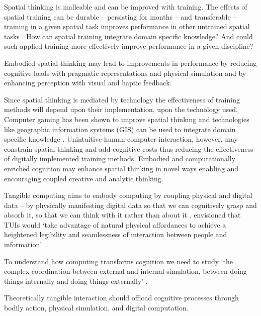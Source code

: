 Spatial thinking is malleable and can be improved with training. 
The effects of spatial training can be durable -- persisting for months -- and transferable -- training in a given spatial task improves performance in other untrained spatial tasks \cite{Uttal2013}. 
How can spatial training integrate domain specific knowledge? And could such applied training more effectively improve performance in a given discipline? \cite{Uttal2013} 

Embodied spatial thinking may lead to improvements in performance by reducing cognitive loads with pragmatic representations and physical simulation and by enhancing perception with visual and haptic feedback. 

Since spatial thinking is mediated by technology the effectiveness of training methods will depend upon their implementation, upon the technology used. 
Computer gaming has been shown to improve spatial thinking and technologies like geographic information systems (GIS) can be used to integrate domain specific knowledge \cite{Uttal2013}.
Unintuitive human-computer interaction, however, may constrain spatial thinking and add cognitive costs thus reducing the effectiveness of digitally implemented training methods. 
Embodied and computationally enriched cognition may enhance spatial thinking in novel ways
enabling and encouraging coupled creative and analytic thinking.




Tangible computing aims to embody computing 
by coupling physical and digital data \cite{Dourish2001} -- 
by physically manifesting digital data so that we can cognitively grasp and absorb it,
so that we can think with it rather than about it \cite{Kirsh2013}. 
\cite{Ishii1997} envisioned that TUIs would  `take advantage of natural physical affordances to achieve a heightened legibility and seamlessness of interaction between people and information' \cite{Ishii1997}. 

To understand how computing transforms cognition we need to study
`the complex coordination between external and internal simulation, between doing things internally and doing things externally' \cite{Kirsh2013}. %


Theoretically tangible interaction should offload cognitive processes through bodily action, physical simulation, and digital computation.

